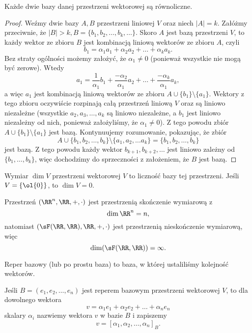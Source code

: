 \begin{theorem}
    \label{t:equinumerous bases}
    Każde dwie bazy danej przestrzeni wektorowej są równoliczne.
\end{theorem}
\begin{proof}
    Weźmy dwie bazy $A, B$ przestrzeni liniowej $V$ oraz niech $|A| = k$. Załóżmy przeciwnie, że $|B| > k, B = \{b_1, b_2, \ldots, b_k, \ldots\}$. Skoro $A$ jest bazą przestrzeni $V$, to każdy wektor ze zbioru $B$ jest kombinacją liniową wektorów ze zbioru $A$, czyli
    \[ b_1 = \alpha_1a_1 + \alpha_2a_2 + \ldots + \alpha_ka_k. \]
    Bez straty ogólności możemy założyć, że $\alpha_1 \neq 0$ (ponieważ wszystkie nie mogą być zerowe). Wtedy
    \[ a_1 = \frac{1}{\alpha_1}b_1 + \frac{-\alpha_2}{\alpha_1}a_2 + \ldots + \frac{-\alpha_k}{\alpha_1}a_k, \]
    a więc $a_1$ jest kombinacją liniową wektorów ze zbioru $A \cup \{b_1\} \setminus \{a_1\}$. Wektory z tego zbioru oczywiście rozpinają całą przestrzeń liniową $V$ oraz są liniowo niezależne (wszystkie $a_2, a_3, \ldots, a_k$ są liniowo niezależne, a $b_1$ jest liniowo niezależny od nich, ponieważ założyliśmy, że $\alpha_1 \neq 0$). Z tego powodu zbiór $A \cup \{b_1\} \setminus \{a_1\}$ jest bazą. Kontynuujemy rozumowanie, pokazując, że zbiór
    \[ A \cup \{b_1, b_2, \ldots, b_k\} \setminus \{a_1, a_2, \ldots a_k\} = \{b_1, b_2, \ldots, b_k\} \]
    jest bazą. Z tego powodu każdy wektor $b_{k+1}, b_{k+2}, \ldots$ jest liniowo zależny od $\{b_1, \ldots, b_k\}$, więc dochodzimy do sprzeczności z założeniem, że $B$ jest bazą.
\end{proof}

\begin{definition}
    Wymiar $\dim V$ przestrzeni wektorowej $V$ to liczność bazy tej przestrzeni. Jeśli $V = \{\ol{0}\}$, to $\dim V = 0$.
\end{definition}

\begin{example}
    Przestrzeń $(\RR^n, \RR, +, \cdot)$ jest przestrzenią skończenie wymiarową z
    \[ \dim\RR^n = n, \]
    natomiast $(\sF(\RR,\RR), \RR, +, \cdot)$ jest przestrzenią nieskończenie wymiarową, więc
    \[ \dim (\sF(\RR,\RR)) = \infty. \]
\end{example}

\begin{definition}
    Reper bazowy (lub po prostu baza) to baza, w której ustaliliśmy kolejność wektorów.
\end{definition}

Jeśli $B = (e_1, e_2, \ldots, e_n)$ jest reperem bazowym przestrzeni wektorowej $V$, to dla dowolnego wektora
\[ v = \alpha_1e_1 + \alpha_2e_2 + \ldots + \alpha_ne_n \]
skalary $\alpha_i$ nazwiemy  wektora $v$ w bazie $B$ i zapiszemy
\[ v = [\alpha_1, \alpha_2, \ldots, \alpha_n]_B. \]

